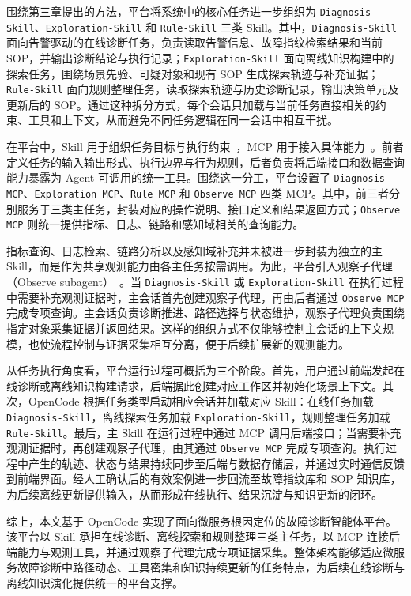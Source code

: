 围绕第三章提出的方法，平台将系统中的核心任务进一步组织为 \texttt{Diagnosis-Skill}、\texttt{Exploration-Skill} 和 \texttt{Rule-Skill} 三类 Skill。其中，\texttt{Diagnosis-Skill} 面向告警驱动的在线诊断任务，负责读取告警信息、故障指纹检索结果和当前 SOP，并输出诊断结论与执行记录；\texttt{Exploration-Skill} 面向离线知识构建中的探索任务，围绕场景先验、可疑对象和现有 SOP 生成探索轨迹与补充证据；\texttt{Rule-Skill} 面向规则整理任务，读取探索轨迹与历史诊断记录，输出决策单元及更新后的 SOP。通过这种拆分方式，每个会话只加载与当前任务直接相关的约束、工具和上下文，从而避免不同任务逻辑在同一会话中相互干扰。

在平台中，Skill 用于组织任务目标与执行约束~\cite{claudecode_skills,claudecode-subagent}，MCP 用于接入具体能力~\cite{mcp,luo2025mcpuniverse,jayanti2026camcp,koc2025mcpide}。前者定义任务的输入输出形式、执行边界与行为规则，后者负责将后端接口和数据查询能力暴露为 Agent 可调用的统一工具。围绕这一分工，平台设置了 \texttt{Diagnosis MCP}、\texttt{Exploration MCP}、\texttt{Rule MCP} 和 \texttt{Observe MCP} 四类 MCP。其中，前三者分别服务于三类主任务，封装对应的操作说明、接口定义和结果返回方式；\texttt{Observe MCP} 则统一提供指标、日志、链路和感知域相关的查询能力。

指标查询、日志检索、链路分析以及感知域补充并未被进一步封装为独立的主 Skill，而是作为共享观测能力由各主任务按需调用。为此，平台引入观察子代理（Observe subagent）~\cite{claudecode-subagent}。当 \texttt{Diagnosis-Skill} 或 \texttt{Exploration-Skill} 在执行过程中需要补充观测证据时，主会话首先创建观察子代理，再由后者通过 \texttt{Observe MCP} 完成专项查询。主会话负责诊断推进、路径选择与状态维护，观察子代理负责围绕指定对象采集证据并返回结果。这样的组织方式不仅能够控制主会话的上下文规模，也使流程控制与证据采集相互分离，便于后续扩展新的观测能力。

从任务执行角度看，平台运行过程可概括为三个阶段。首先，用户通过前端发起在线诊断或离线知识构建请求，后端据此创建对应工作区并初始化场景上下文。其次，OpenCode 根据任务类型启动相应会话并加载对应 Skill：在线任务加载 \texttt{Diagnosis-Skill}，离线探索任务加载 \texttt{Exploration-Skill}，规则整理任务加载 \texttt{Rule-Skill}。最后，主 Skill 在运行过程中通过 MCP 调用后端接口；当需要补充观测证据时，再创建观察子代理，由其通过 \texttt{Observe MCP} 完成专项查询。执行过程中产生的轨迹、状态与结果持续同步至后端与数据存储层，并通过实时通信反馈到前端界面。经人工确认后的有效案例进一步回流至故障指纹库和 SOP 知识库，为后续离线更新提供输入，从而形成在线执行、结果沉淀与知识更新的闭环。

综上，本文基于 OpenCode 实现了面向微服务根因定位的故障诊断智能体平台。该平台以 Skill 承担在线诊断、离线探索和规则整理三类主任务，以 MCP 连接后端能力与观测工具，并通过观察子代理完成专项证据采集。整体架构能够适应微服务故障诊断中路径动态、工具密集和知识持续更新的任务特点，为后续在线诊断与离线知识演化提供统一的平台支撑。
